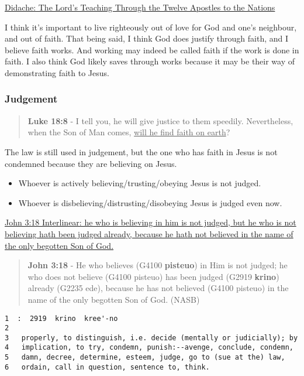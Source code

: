 \documentclass[11pt]{article}
\begin{document}
\href{https://www.earlychristianwritings.com/text/didache-roberts.html}{Didache: The Lord's Teaching Through the Twelve Apostles to the Nations}

I think it's important to live righteously out of love for God and one's neighbour, and out of faith.
That being said, I think God does justify through faith, and I believe faith works. And working may indeed be called faith if the work is done in faith.
I also think God likely saves through works because it may be their way of demonstrating faith to Jesus.

\subsubsection{Judgement}
\label{sec:org7491a0d}
\begin{quote}
\textbf{Luke 18:8} - I tell you, he will give justice to them speedily. Nevertheless, when the Son of Man comes, \uline{will he find faith on earth}?
\end{quote}

The law is still used in judgement, but the one who has faith in Jesus is not condemned because they are believing on Jesus.

\begin{itemize}
\item Whoever is actively believing/trusting/obeying Jesus is not judged.
\item Whoever is disbelieving/distrusting/disobeying Jesus is judged even now.
\end{itemize}

\href{https://biblehub.com/interlinear/john/3-18.htm}{John 3:18 Interlinear: he who is believing in him is not judged, but he who is not believing hath been judged already, because he hath not believed in the name of the only begotten Son of God.}

\begin{quote}
\textbf{John 3:18} - He who believes (G4100 \textbf{pisteuo}) in Him is not judged; he who does not believe (G4100 pisteuo) has been judged (G2919 \textbf{krino}) already (G2235 ede), because he has not believed (G4100 pisteuo) in the name of the only begotten Son of God. (NASB)
\end{quote}

\begin{verbatim}
1  :  2919  krino  kree'-no
2  
3   properly, to distinguish, i.e. decide (mentally or judicially); by
4   implication, to try, condemn, punish:--avenge, conclude, condemn,
5   damn, decree, determine, esteem, judge, go to (sue at the) law,
6   ordain, call in question, sentence to, think.
\end{verbatim}
\end{document}
